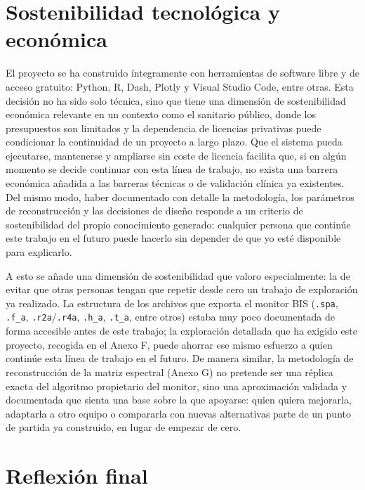 \documentclass[
  spanish,
  a4paper,
  12pt,
  twoside]{memoir}
\begin{document}
\chapter{Sostenibilidad tecnológica y
económica}\label{sostenibilidad-tecnoluxf3gica-y-econuxf3mica}

El proyecto se ha construido íntegramente con herramientas de software
libre y de acceso gratuito: Python, R, Dash, Plotly y Visual Studio
Code, entre otras. Esta decisión no ha sido solo técnica, sino que tiene
una dimensión de sostenibilidad económica relevante en un contexto como
el sanitario público, donde los presupuestos son limitados y la
dependencia de licencias privativas puede condicionar la continuidad de
un proyecto a largo plazo. Que el sistema pueda ejecutarse, mantenerse y
ampliarse sin coste de licencia facilita que, si en algún momento se
decide continuar con esta línea de trabajo, no exista una barrera
económica añadida a las barreras técnicas o de validación clínica ya
existentes. Del mismo modo, haber documentado con detalle la
metodología, los parámetros de reconstrucción y las decisiones de diseño
responde a un criterio de sostenibilidad del propio conocimiento
generado: cualquier persona que continúe este trabajo en el futuro puede
hacerlo sin depender de que yo esté disponible para explicarlo.

A esto se añade una dimensión de sostenibilidad que valoro
especialmente: la de evitar que otras personas tengan que repetir desde
cero un trabajo de exploración ya realizado. La estructura de los
archivos que exporta el monitor BIS (\texttt{.spa}, \texttt{.f\_a},
\texttt{.r2a}/\texttt{.r4a}, \texttt{.h\_a}, \texttt{.t\_a}, entre
otros) estaba muy poco documentada de forma accesible antes de este
trabajo; la exploración detallada que ha exigido este proyecto, recogida
en el Anexo F, puede ahorrar ese mismo esfuerzo a quien continúe esta
línea de trabajo en el futuro. De manera similar, la metodología de
reconstrucción de la matriz espectral (Anexo G) no pretende ser una
réplica exacta del algoritmo propietario del monitor, sino una
aproximación validada y documentada que sienta una base sobre la que
apoyarse: quien quiera mejorarla, adaptarla a otro equipo o compararla
con nuevas alternativas parte de un punto de partida ya construido, en
lugar de empezar de cero.

\chapter{Reflexión final}\label{reflexiuxf3n-final}
\end{document}
